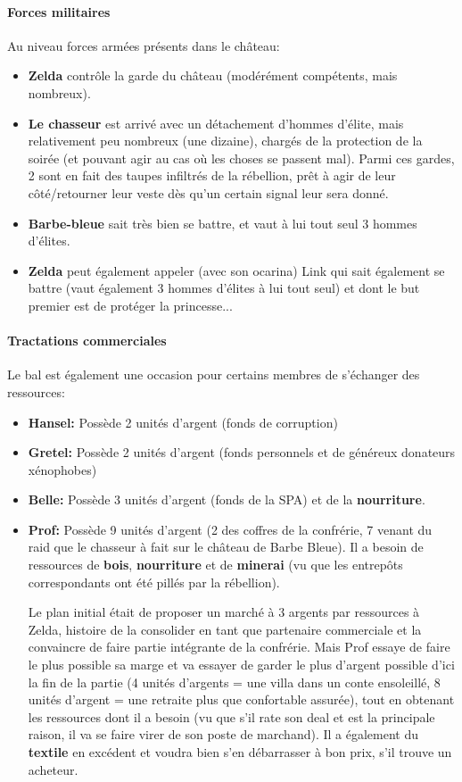 {	\paragraph{Forces militaires} Au niveau forces armées présents dans le château:
	\begin{itemize}
		\item \textbf{Zelda} contrôle la garde du château (modérément compétents, mais nombreux).
		\item \textbf{Le chasseur} est arrivé avec un détachement d'hommes d'élite, mais relativement peu nombreux (une dizaine), chargés de la protection de la soirée (et pouvant agir au cas où les choses se passent mal). Parmi ces gardes, 2 sont en fait des taupes infiltrés de la rébellion, prêt à agir de leur côté/retourner leur veste dès qu'un certain signal leur sera donné.
		\item \textbf{Barbe-bleue} sait très bien se battre, et vaut à lui tout seul 3 hommes d'élites.
		\item \textbf{Zelda} peut également appeler (avec son ocarina) Link qui sait également se battre (vaut également 3 hommes d'élites à lui tout seul) et dont le but premier est de protéger la princesse...
	\end{itemize}


	\paragraph{Tractations commerciales} Le bal est également une occasion pour certains membres de s'échanger des ressources:
	\begin{itemize}
		\item \textbf{Hansel:} Possède 2 unités d'argent (fonds de corruption)
		
		\item \textbf{Gretel:} Possède 2 unités d'argent (fonds personnels et de généreux donateurs xénophobes)
		
		\item \textbf{Belle:} Possède 3 unités d'argent (fonds de la SPA) et de la \textbf{nourriture}.
		
		\item \textbf{Prof:} Possède 9 unités d'argent (2 des coffres de la confrérie, 7 venant du raid que le chasseur à fait sur le château de Barbe Bleue). Il a besoin de ressources de \textbf{bois}, \textbf{nourriture} et de \textbf{minerai} (vu que les entrepôts correspondants ont été pillés par la rébellion).
		
		Le plan initial était de proposer un marché à 3 argents par ressources à Zelda, histoire de la consolider en tant que partenaire commerciale et la convaincre de faire partie intégrante de la confrérie. Mais Prof essaye de faire le plus possible sa marge et va essayer de garder le plus d'argent possible d'ici la fin de la partie (4 unités d'argents = une villa dans un conte ensoleillé, 8 unités d'argent = une retraite plus que confortable assurée), tout en obtenant les ressources dont il a besoin (vu que s'il rate son deal et est la principale raison, il va se faire virer de son poste de marchand). Il a également du \textbf{textile} en excédent et voudra bien s'en débarrasser à bon prix, s'il trouve un acheteur.
		

\end{itemize}}
